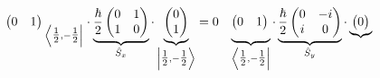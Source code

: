 \documentclass[../notes.tex]{subfiles}
\begin{document}
\begin{itemize}
\begin{itemize}
\begin{itemize}
\begin{align*}
{\begin{pmatrix}
                        0 & 1\\
                    \end{pmatrix}
                    \vphantom{
                        \frac{\hbar}{2}
                        \begin{pmatrix}
                            0 & 1\\
                            1 & 0\\
                        \end{pmatrix}
                    }
                }_{\bra{\tfrac{1}{2},-\tfrac{1}{2}}}\cdot\underbrace{
                    \frac{\hbar}{2}
                    \begin{pmatrix}
                        0 & 1\\
                        1 & 0\\
                    \end{pmatrix}
                }_{\hat{S}_x}\cdot\underbrace{
                    \begin{pmatrix}
                        0\\
                        1\\
                    \end{pmatrix}
                }_{\ket{\tfrac{1}{2},-\tfrac{1}{2}}} &= 0&
                    \underbrace{
                        \begin{pmatrix}
                            0 & 1\\
                        \end{pmatrix}
                        \vphantom{
                            \frac{\hbar}{2}
                            \begin{pmatrix}
                                0 & -i\\
                                i & 0\\
                            \end{pmatrix}
                        }
                    }_{\bra{\tfrac{1}{2},-\tfrac{1}{2}}}\cdot\underbrace{
                        \frac{\hbar}{2}
                        \begin{pmatrix}
                            0 & -i\\
                            i & 0\\
                        \end{pmatrix}
                    }_{\hat{S}_y}\cdot\underbrace{
                        \begin{pmatrix}
                            0\\

\end{pmatrix}}
\end{align*}
\end{itemize}
\end{itemize}
\end{itemize}
\end{document}
